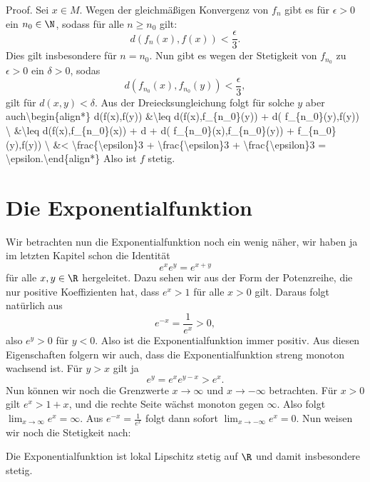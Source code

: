 \documentclass[letterpaper,10pt,english]{jupyterBook}
\begin{document}
\begin{emphBox}{}{}
Proof.  Sei \(x \in M\). Wegen der gleichmäßigen Konvergenz von \(f_n\) gibt es für \(\epsilon > 0\) ein \(n_0 \in \N\), sodass für alle \(n \geq n_0\) gilt:
\begin{equation*}
 d(f_n(x),f(x)) < \frac{\epsilon}3.
\end{equation*}
Dies gilt insbesondere für \(n=n_0\). Nun gibt es wegen der Stetigkeit von \(f_{n_0}\) zu \(\epsilon > 0\) ein \(\delta > 0\), sodas
\begin{equation*}
 d(f_{n_0}(x),f_{n_0}(y)) < \frac{\epsilon}3,
\end{equation*}
gilt für \(d(x,y) < \delta\). Aus der Dreiecksungleichung folgt für solche \(y\) aber auch\textbackslash{}begin\{align*\} d(f(x),f(y)) \&\textbackslash{}leq d(f(x),f\_\{n\_0\}(y)) + d( f\_\{n\_0\}(y),f(y)) \textbackslash{} \&\textbackslash{}leq d(f(x),f\_\{n\_0\}(x)) + d + d( f\_\{n\_0\}(x),f\_\{n\_0\}(y)) + f\_\{n\_0\}(y),f(y)) \textbackslash{} \&< \textbackslash{}frac\{\textbackslash{}epsilon\}3 + \textbackslash{}frac\{\textbackslash{}epsilon\}3 + \textbackslash{}frac\{\textbackslash{}epsilon\}3 = \textbackslash{}epsilon.\textbackslash{}end\{align*\}
Also ist \(f\) stetig.
\end{emphBox}


\section{Die Exponentialfunktion}
\label{\detokenize{stetigkeit/exp:die-exponentialfunktion}}\label{\detokenize{stetigkeit/exp::doc}}
Wir betrachten nun die Exponentialfunktion noch ein wenig näher, wir haben ja im letzten Kapitel schon die Identität
\begin{equation*}
 e^x e^y = e^{x+y}
\end{equation*}
für alle \(x,y \in \R\) hergeleitet. Dazu sehen wir aus der Form der Potenzreihe, die nur positive Koeffizienten hat, dass \(e^x > 1\) für alle \(x > 0\) gilt. Daraus folgt natürlich aus
\begin{equation*}
 e^{-x} = \frac{1}{e^x} > 0,
\end{equation*}
also \(e^y > 0\) für \(y < 0\). Also ist die Exponentialfunktion immer positiv.
Aus diesen Eigenschaften folgern wir auch, dass die Exponentialfunktion streng monoton wachsend ist. Für \(y > x\) gilt ja
\begin{equation*}
 e^y = e^x e^{y-x} > e^x.
\end{equation*}
Nun können wir noch die Grenzwerte \(x \rightarrow \infty\) und \(x \rightarrow - \infty\) betrachten. Für \(x > 0\) gilt \(
e^x > 1+x\), und die rechte Seite wächst monoton gegen \(\infty\). Also folgt \(\lim_{x \rightarrow \infty} e^x = \infty. \) Aus \(e^{-x} = \frac{1}{e^x} \) folgt dann sofort \(\lim_{x \rightarrow - \infty} e^x = 0. \)
Nun weisen wir noch die Stetigkeit nach:
\label{stetigkeit/exp:theorem-0}
\begin{theorem}{}{}



Die Exponentialfunktion ist lokal Lipschitz stetig auf \(\R\) und damit insbesondere stetig.
\end{theorem}
\end{document}
